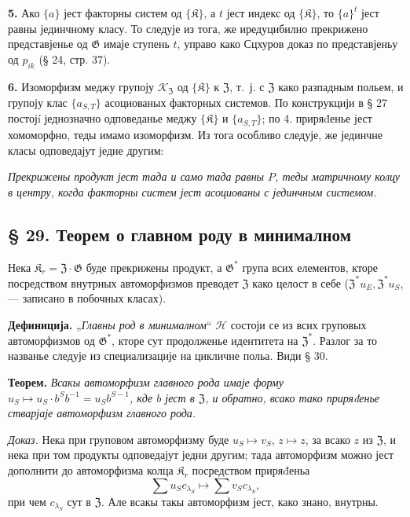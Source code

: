\documentclass[11pt]{article}
\begin{document}
\noindent\textbf{5.} Ако \(\{a\}\) јест факторны систем од \(\{\mathfrak K\}\), а \(t\) јест индекс од \(\{\mathfrak K\}\), то \(\{a\}^t\) јест равны јединчному класу. То следује из тога, же иредуцибилно прекрижено представјенье од \(\mathfrak G\) имаје ступень \(t\), управо како Сцхуров доказ по представјеньу од \(p_{ik}\) (§ 24, стр. 37).

\noindent\textbf{6.} Изоморфизм меджу групоју \(\mathscr K_{\mathfrak Z}\) од \(\{\mathfrak K\}\) к \(\mathfrak Z\), т.~ј. с \(\mathfrak Z\) како разпадным польем, и групоју клас \(\{a_{S,T}\}\) асоциованых факторных системов. По конструкцији в § 27 постојí једнозначно одповеданье меджу \(\{\mathfrak K\}\) и \(\{a_{S,T}\}\); по 4. приряđенье јест хомоморфно, теды имамо изоморфизм. Из тога особливо следује, же јединчне класы одповедајут једне другим:

\noindent\emph{Прекрижены продукт јест тада и само тада равны \(P\), теды матричному колцу в центру, когда факторны систем јест асоциованы с јединчным системом.}

\subsection*{§ 29. Теорем о главном роду в минималном}\label{hauptgeschlechtssatz-im-minimalen}

Нека \(\mathfrak K_r=\mathfrak Z\cdot\mathfrak G\) буде прекрижены продукт, а \(\mathfrak G^*\) група всих елементов, кторе посредством внутрных автоморфизмов преводет \(\mathfrak Z\) како целост в себе (\(\mathfrak Z^*u_E,\mathfrak Z^*u_S\), --- записано в побочных класах).

\noindent\textbf{Дефиниција.} „\emph{Главны род в минималном}“ \(\mathscr H\) состоји се из всих груповых автоморфизмов од \(\mathfrak G^*\), кторе сут продолженье идентитета на \(\mathfrak Z^*\). Разлог за то названье следује из специализације на цикличне польа. Види § 30.

\noindent\textbf{Теорем.} \emph{Всакы автоморфизм главного рода имаје форму \(u_S\mapsto u_S\cdot b^Sb^{-1}=u_Sb^{S-1}\), кде \(b\) јест в \(\mathfrak Z\), и обратно, всако тако приряđенье стварјаје автоморфизм главного рода.}

\noindent\emph{Доказ.} Нека при груповом автоморфизму буде \(u_S\mapsto v_S\), \(z\mapsto z\), за всако \(z\) из \(\mathfrak Z\), и нека при том продукты одповедајут једни другим; тада автоморфизм можно јест дополнити до автоморфизма колца \(\mathfrak K_r\) посредством приряđеньа
\[
\sum u_Sc_{\lambda_S}\mapsto\sum v_Sc_{\lambda_S},
\]
при чем \(c_{\lambda_S}\) сут в \(\mathfrak Z\). Але всакы такы автоморфизм јест, како знано, внутрны.
\end{document}
